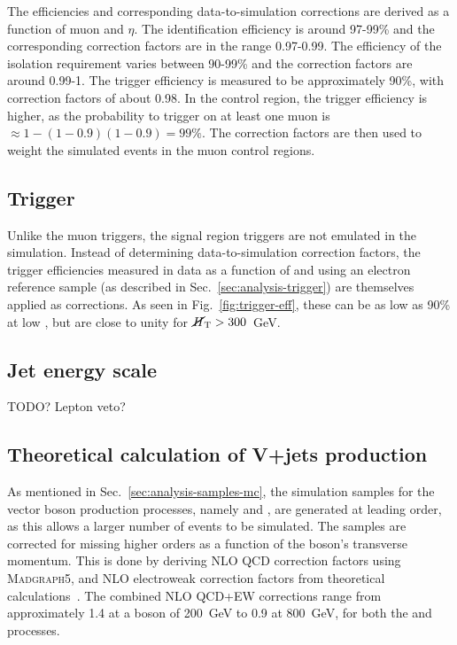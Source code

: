 The efficiencies and corresponding data-to-simulation corrections are derived 
as a function of muon \pt and $\eta$. The identification efficiency is around 
97-99\% and the corresponding correction factors are in the range 0.97-0.99. 
The efficiency 
of the isolation requirement varies between 90-99\% and the correction factors 
are around 0.99-1. The trigger efficiency is measured to be approximately 90\%, 
with correction factors of about 0.98. 
In the \mmj control region, the trigger efficiency is higher, as the 
probability to trigger on at least one muon is $\approx 1-(1-0.9)(1-0.9) = 
99\%$.
The correction factors are then used to weight the simulated events in the muon 
control regions.

\subsection{Trigger}
Unlike the muon triggers, the signal region triggers are not emulated in the 
simulation. Instead of determining data-to-simulation correction factors, the 
trigger efficiencies measured in data as a function of \scalht and \mht using 
an electron reference sample (as described in Sec.~\ref{sec:analysis-trigger}) 
are themselves applied as corrections. As seen in 
Fig.~\ref{fig:trigger-eff}, these can be as low as 90\% at low \mht, but 
are close to unity for $\mbox{$\cancel{H}_\text{T}$}>300$~GeV.

\subsection{Jet energy scale}
TODO?
Lepton veto?

\subsection{Theoretical calculation of V+jets production}
As mentioned in Sec.~\ref{sec:analysis-samples-mc}, the simulation samples for 
the vector boson production processes, namely \zj and \wj, are generated at 
leading order, as this allows a larger number of events to be simulated. 
The samples are corrected for missing higher orders as a function of the 
boson's transverse momentum. This is done by deriving NLO QCD correction 
factors using \textsc{Madgraph5}, and NLO electroweak correction factors from 
theoretical calculations~\cite{nlo,nlo}. The combined NLO QCD+EW corrections 
range from approximately 1.4 at a boson \pt of 200~GeV to 0.9 at 800~GeV, for 
both the \zj and \wj processes.

